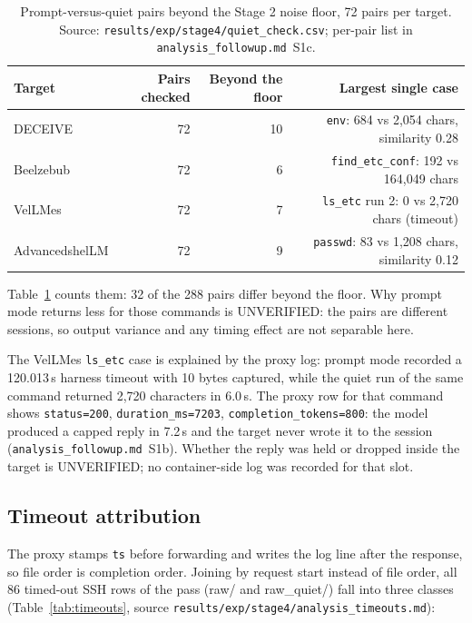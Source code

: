 \documentclass[a4paper,11pt]{article}
\begin{document}
\begin{table}[ht]
\centering
\caption{Prompt-versus-quiet pairs beyond the Stage 2 noise floor, 72 pairs per
target. Source: \texttt{results/exp/stage4/quiet\_check.csv}; per-pair list in
\texttt{analysis\_followup.md}~S1c.}
\label{tab:quiet}
\scriptsize
\begin{tabular}{l r r r}
\toprule
Target & Pairs checked & Beyond the floor & Largest single case \\
\midrule
DECEIVE        & 72 & 10 & \texttt{env}: 684 vs 2,054 chars, similarity 0.28 \\
Beelzebub      & 72 & 6  & \texttt{find\_etc\_conf}: 192 vs 164,049 chars \\
VelLMes        & 72 & 7  & \texttt{ls\_etc} run 2: 0 vs 2,720 chars (timeout) \\
AdvancedshelLM & 72 & 9  & \texttt{passwd}: 83 vs 1,208 chars, similarity 0.12 \\
\bottomrule
\end{tabular}
\end{table}

Table~\ref{tab:quiet} counts them: 32 of the 288 pairs differ beyond the floor.
Why prompt mode returns less for
those commands is UNVERIFIED: the pairs are different sessions, so output
variance and any timing effect are not separable here.

The VelLMes \texttt{ls\_etc} case is explained by the proxy log: prompt mode
recorded a 120.013\,s harness timeout with 10 bytes captured, while the quiet
run of the same command returned 2,720 characters in 6.0\,s. The proxy row for
that command shows \texttt{status=200}, \texttt{duration\_ms=7203},
\texttt{completion\_tokens=800}: the model produced a capped reply in 7.2\,s and
the target never wrote it to the session
(\texttt{analysis\_followup.md}~S1b). Whether the reply was held or dropped
inside the target is UNVERIFIED; no container-side log was recorded for that
slot.

\subsection{Timeout attribution}
\label{sec:timeouts}

The proxy stamps \texttt{ts} before forwarding and writes the log line after
the response, so file order is completion order. Joining by request start
instead of file order, all 86 timed-out SSH rows of the pass (raw/ and
raw\_quiet/) fall into three classes (Table~\ref{tab:timeouts},
source \texttt{results/exp/stage4/analysis\_timeouts.md}):
\end{document}
